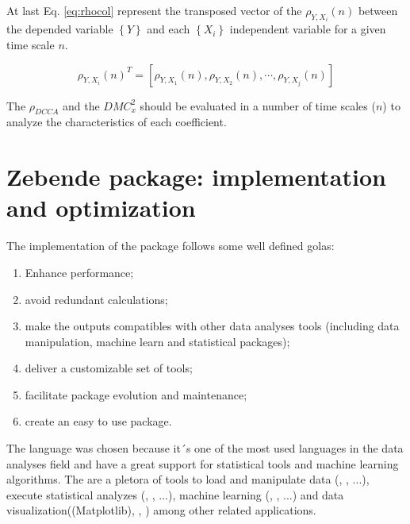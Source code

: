 \documentclass[article]{jss}
\begin{document}
At last Eq. \ref{eq:rhocol} represent the transposed vector of the $\rho_{Y,X_{i}}(n)$ between the depended variable $\left\lbrace Y \right\rbrace $ and each $\left\lbrace X_{i} \right\rbrace $ independent variable for a given time scale $n$.

\begin{equation} \label{eq:rhocol}
  \rho_{Y,X_i}(n)^T=[\rho_{Y,X_1}(n), \rho_{Y,X_2}(n),\cdots,\rho_{Y,X_j}(n)]
\end{equation}

The $\rho_{DCCA}$ and the $DMC_x^2$ should be evaluated in a number of time scales ($n$) to analyze the characteristics of each coefficient.



\section{Zebende package: implementation and optimization} \label{sec:optimization}

The implementation of the  package follows some well defined golas:

\begin{enumerate}
  \item Enhance performance;
  \item avoid redundant calculations;
  \item make the outputs compatibles with other data analyses tools (including data manipulation, machine learn and statistical packages);
  \item deliver a customizable set of tools;
  \item facilitate package evolution and maintenance;
  \item create an easy to use package.
\end{enumerate}

The  language was chosen because it´s one of the most used languages in the data analyses field and have a great support for statistical tools and machine learning algorithms. The are a pletora of tools to load and manipulate data (, ,  ...), execute statistical analyzes (, ,  ...), machine learning (, , ...) and data visualization(\pkg(Matplotlib), , ) among other related applications.
\end{document}
